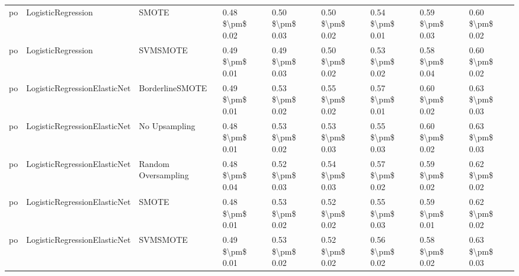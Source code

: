 \begin{tabular}{lllllllll}
      po &              LogisticRegression &                         SMOTE & 0.48 \$\textbackslash pm\$ 0.02 &           0.50 \$\textbackslash pm\$ 0.03 &       0.50 \$\textbackslash pm\$ 0.02 &        0.54 \$\textbackslash pm\$ 0.01 &                         0.59 \$\textbackslash pm\$ 0.03 &     0.60 \$\textbackslash pm\$ 0.02 \\
      po &              LogisticRegression &                      SVMSMOTE & 0.49 \$\textbackslash pm\$ 0.01 &           0.49 \$\textbackslash pm\$ 0.03 &       0.50 \$\textbackslash pm\$ 0.02 &        0.53 \$\textbackslash pm\$ 0.02 &                         0.58 \$\textbackslash pm\$ 0.04 &     0.60 \$\textbackslash pm\$ 0.02 \\
      po &    LogisticRegressionElasticNet &               BorderlineSMOTE & 0.49 \$\textbackslash pm\$ 0.01 &           0.53 \$\textbackslash pm\$ 0.02 &       0.55 \$\textbackslash pm\$ 0.02 &        0.57 \$\textbackslash pm\$ 0.01 &                         0.60 \$\textbackslash pm\$ 0.02 &     0.63 \$\textbackslash pm\$ 0.03 \\
      po &    LogisticRegressionElasticNet &                 No Upsampling & 0.48 \$\textbackslash pm\$ 0.01 &           0.53 \$\textbackslash pm\$ 0.02 &       0.53 \$\textbackslash pm\$ 0.03 &        0.55 \$\textbackslash pm\$ 0.03 &                         0.60 \$\textbackslash pm\$ 0.02 &     0.63 \$\textbackslash pm\$ 0.03 \\
      po &    LogisticRegressionElasticNet &           Random Oversampling & 0.48 \$\textbackslash pm\$ 0.04 &           0.52 \$\textbackslash pm\$ 0.03 &       0.54 \$\textbackslash pm\$ 0.03 &        0.57 \$\textbackslash pm\$ 0.02 &                         0.59 \$\textbackslash pm\$ 0.02 &     0.62 \$\textbackslash pm\$ 0.02 \\
      po &    LogisticRegressionElasticNet &                         SMOTE & 0.48 \$\textbackslash pm\$ 0.01 &           0.53 \$\textbackslash pm\$ 0.02 &       0.52 \$\textbackslash pm\$ 0.02 &        0.55 \$\textbackslash pm\$ 0.03 &                         0.59 \$\textbackslash pm\$ 0.01 &     0.62 \$\textbackslash pm\$ 0.02 \\
      po &    LogisticRegressionElasticNet &                      SVMSMOTE & 0.49 \$\textbackslash pm\$ 0.01 &           0.53 \$\textbackslash pm\$ 0.02 &       0.52 \$\textbackslash pm\$ 0.02 &        0.56 \$\textbackslash pm\$ 0.02 &                         0.58 \$\textbackslash pm\$ 0.02 &     0.63 \$\textbackslash pm\$ 0.03 \\

\end{tabular}
